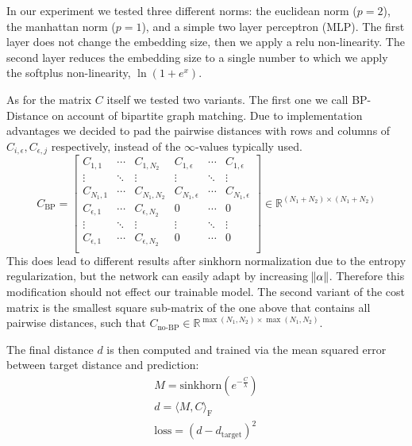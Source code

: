 In our experiment we tested three different norms: the euclidean norm ($p=2$), the manhattan norm ($p=1$), and a simple two layer perceptron (MLP). The first layer does not change the embedding size, then we apply a relu non-linearity. The second layer reduces the embedding size to a single number to which we apply the softplus non-linearity, $\ln(1 + e^x)$.

As for the matrix $C$ itself we tested two variants. The first one we call BP-Distance on account of bipartite graph matching. Due to implementation advantages we decided to pad the pairwise distances with rows and columns of $C_{i, \epsilon}, C_{\epsilon, j}$ respectively, instead of the $\infty$-values typically used.
\begin{equation}
     C_\text{BP}=
          \left[
          \begin{array}{ccc|ccc}
               C_{1,1} & \dotsi & C_{1, N_2} & C_{1, \epsilon} & \dotsi & C_{1, \epsilon} \\
               \vdots & \ddots & \vdots & \vdots & \ddots & \vdots \\
               C_{N_1, 1} & \dotsi & C_{N_1, N_2} & C_{N_1, \epsilon} & \dotsi & C_{N_1, \epsilon} \\
               \hline
               C_{\epsilon, 1} & \dotsi & C_{\epsilon, N_2} & 0 & \dotsi & 0 \\
               \vdots & \ddots & \vdots & \vdots & \ddots & \vdots \\
               C_{\epsilon, 1} & \dotsi & C_{\epsilon, N_2} & 0 & \dotsi & 0 \\
          \end{array}
          \right]
     \in \mathbb{R}^{(N_1 + N_2) \times (N_1 + N_2)}
\end{equation}
This does lead to different results after sinkhorn normalization due to the entropy regularization, but the network can easily adapt by increasing $\norm{\alpha}$. Therefore this modification should not effect our trainable model. The second variant of the cost matrix is the smallest square sub-matrix of the one above that contains all pairwise distances, such that \mbox{$C_\text{no-BP} \in \mathbb{R}^{\max({N_1, N_2}) \times \max({N_1, N_2})}$}.

The final distance $d$ is then computed and trained via the mean squared error between target distance and prediction:
\begin{equation}
     \begin{gathered}
          M = \text{sinkhorn}(e^{-\frac{C}{\lambda}}) \\
          d = \langle M, C \rangle_\mathrm{F} \\
          \text{loss} = (d - d_\text{target})^2
     \end{gathered}
\end{equation}

